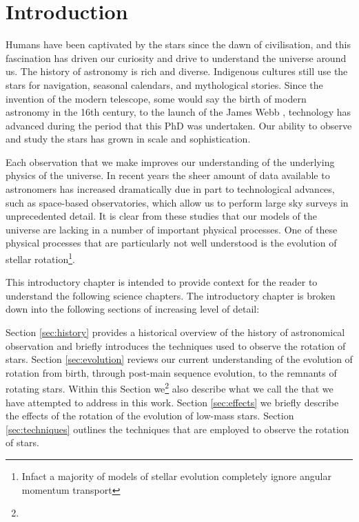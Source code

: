 
\newcommand\dive{\textmd{div}}
\newcommand\der{\textmd{d}}



\chapter{Introduction}

Humans have been captivated by the stars since the dawn of civilisation, and this fascination has driven our curiosity and drive to understand the universe around us. 
The history of astronomy is rich and diverse. 
Indigenous cultures still use the stars for navigation, seasonal calendars, and mythological stories. 
Since the invention of the modern telescope, some would say the birth of modern astronomy in the 16th century, to the launch of the James Webb , technology has advanced during the period that this PhD was undertaken. 
Our ability to observe and study the stars has grown in scale and sophistication. 

Each observation that we make improves our understanding of the underlying physics of the universe. 
In recent years the sheer amount of data available to astronomers has increased dramatically due in part to technological advances, such as space-based observatories, which allow us to perform large sky surveys in unprecedented detail. 
It is clear from these studies that our models of the universe are lacking in a number of important physical processes. 
One of these physical processes that are particularly not well understood is the evolution of stellar rotation\footnote{Infact a majority of models of stellar evolution completely ignore angular momentum transport}.

This introductory chapter is intended to provide context for the reader to understand the following science chapters. 
The introductory chapter is broken down into the following sections of increasing level of detail:

Section \ref{sec:history} provides a historical overview of the history of astronomical observation and briefly introduces the techniques used to observe the rotation of stars.
Section \ref{sec:evolution} reviews our current understanding of the evolution of rotation from birth, through post-main sequence evolution, to the remnants of rotating stars. Within this Section we\footnote{} also describe what we call the  that we have attempted to address in this work.
Section \ref{sec:effects} we briefly describe the effects of the rotation of the evolution of low-mass stars.
Section \ref{sec:techniques} outlines the techniques that are employed to observe the rotation of stars.

